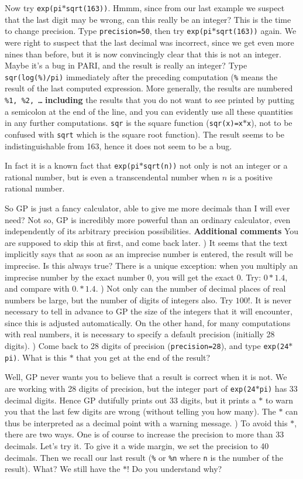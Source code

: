 Now try {\tt exp(pi$*$sqrt(163))}. Hmmm, since from our last example we suspect
that the last digit may be wrong, can this really be an integer?
This is the time to change precision. Type {\tt \bs precision=50},
then try {\tt exp(pi$*$sqrt(163))} again. We were right to suspect that the last
decimal was incorrect, since we get even more nines than before, but it is now
convincingly clear that this is not an integer. Maybe it's a bug in PARI, and
the result is really an integer? Type {\tt sqr(log(\%)/pi)} immediately after
the preceding computation
({\tt \%} means the result of the last computed expression. More generally, the
results are numbered {\tt \%1, \%2, \dots} {\bf including} the results that you
do not want to see printed by putting a semicolon at the end of the line, and
you can evidently use all these quantities in any further computations. {\tt sqr}
is the square function ({\tt sqr(x)=x$*$x}), not to be confused with {\tt sqrt}
which is the square root function). The result seems to be indistinguishable
from 163, hence it does not seem to be a bug.

In fact it is a known fact that {\tt exp(pi$*$sqrt(n))} not only is not an integer
or a rational number, but is even a transcendental number when $n$ is a positive
rational number.

So GP is just a fancy calculator, able to give me more decimals than I will ever
need? Not so, GP is incredibly more powerful than an ordinary calculator, even
independently of its arbitrary precision possibilities.
\medskip
{\bf Additional comments}
\medskip
You are supposed to skip this at first, and come back later.
) It seems that the text implicitly says that as soon as an imprecise number
is entered, the result will be imprecise. Is this always true? There is a unique
exception: when you multiply an imprecise number by the exact number 0, you will
get the exact 0. Try: $0*1.4$, and compare with $0.*1.4$.
) Not only can the number of decimal places of real numbers be large, but the
number of digits of integers also. Try $100!$. It is never necessary to tell
in advance to GP the size of the integers that it will encounter, since this is
adjusted automatically. On the other hand, for many computations with
real numbers, it is necessary to specify a default precision (initially 28 digits).
) Come back to 28 digits of precision ({\tt \bs precision=28}), and type
{\tt exp(24$*$pi)}. What is this $*$ that you get at the end of the result?

Well, GP never wants you to believe that a result is correct when it is not.
We are working with 28 digits of precision, but the integer part of {\tt exp(24$*$pi)}
has 33 decimal digits. Hence GP dutifully prints out 33 digits, but it prints a
$*$ to warn you that the last few digits are wrong (without telling you how
many). The $*$ can thus be interpreted as a decimal point with a warning message.
) To avoid this $*$, there are two ways. One is of course to increase the precision
to more than 33 decimals. Let's try it. To give it a wide margin, we set the
precision to 40 decimals. Then we recall our last result ({\tt \%} or {\tt \%n}
where {\tt n} is the number of the result). What? We still have the $*$! Do you
understand why?

